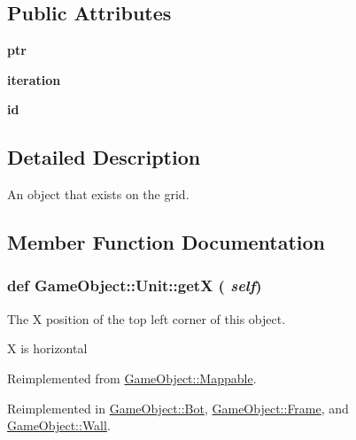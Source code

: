 \subsection*{Public Attributes}
\begin{DoxyCompactItemize}
\item 
\hypertarget{classGameObject_1_1Unit_aeed6c6641d9ab913c271e07ce91f66dc}{
{\bfseries ptr}}
\label{classGameObject_1_1Unit_aeed6c6641d9ab913c271e07ce91f66dc}

\item 
\hypertarget{classGameObject_1_1Unit_aa9e881997b25f4452c57074760815d63}{
{\bfseries iteration}}
\label{classGameObject_1_1Unit_aa9e881997b25f4452c57074760815d63}

\item 
\hypertarget{classGameObject_1_1Unit_a420650a7a0736e831568a65e7b377cd4}{
{\bfseries id}}
\label{classGameObject_1_1Unit_a420650a7a0736e831568a65e7b377cd4}

\end{DoxyCompactItemize}


\subsection{Detailed Description}
An object that exists on the grid. 

\subsection{Member Function Documentation}
\hypertarget{classGameObject_1_1Unit_a01711efd87c7e3e2a97066e9a5c50da5}{
\subsubsection[{getX}]{\setlength{\rightskip}{0pt plus 5cm}def GameObject::Unit::getX ( {\em self})}}
\label{classGameObject_1_1Unit_a01711efd87c7e3e2a97066e9a5c50da5}


The X position of the top left corner of this object. 

X is horizontal 

Reimplemented from \hyperlink{classGameObject_1_1Mappable_a3ae7d302c87c0a6f1e211a7584c3b807}{GameObject::Mappable}.



Reimplemented in \hyperlink{classGameObject_1_1Bot_a76521d97d7dcce093efbdd1926c75750}{GameObject::Bot}, \hyperlink{classGameObject_1_1Frame_aab513e4859fc8a9f5d5f1a6b47cb6df3}{GameObject::Frame}, and \hyperlink{classGameObject_1_1Wall_aa8d092fd75ef8372aacf4ece64521ea8}{GameObject::Wall}.

